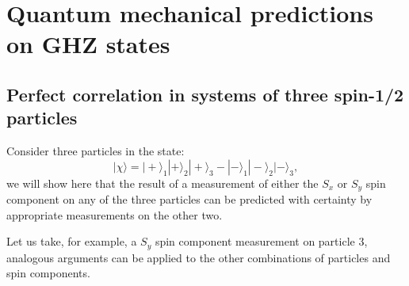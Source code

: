 \section{Quantum mechanical predictions on GHZ states}
%
%
%

\subsection{Perfect correlation in systems of three spin-1/2 particles}
Consider three particles in the state:
\begin{equation}
  |\chi\rangle = |+\rangle_1 |+\rangle_2 |+\rangle_3 - |-\rangle_1 |-\rangle_2 |-\rangle_3,
  \label{eq:ghz-state-app}
\end{equation}
we will show here that the result of a measurement of either the $S_x$ or $S_y$ spin component on any of the three particles can be predicted with certainty by appropriate measurements on the other two.

Let us take, for example, a $S_y$ spin component measurement on particle 3, analogous arguments can be applied to the other combinations of particles and spin components.

